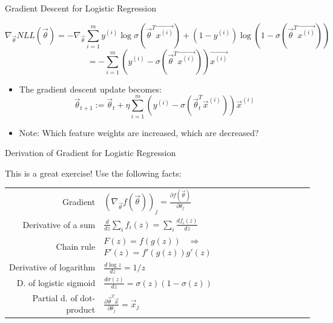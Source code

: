 
\begin{vbframe}{Gradient Descent for Logistic Regression}

\vfill

$$\nabla_{\vec\theta} NLL(\vec \theta) =  -\nabla_{\vec\theta} \sum_{i=1}^m y^{(i)} \log \sigma(\vec{\theta}^T \vec{x^{(i)}}) + (1-y^{(i)}) \log (1 - \sigma(\vec{\theta}^T \vec{x^{(i)}}))$$
$$= - \sum_{i=1}^m (y^{(i)} - \sigma(\vec{\theta}^T \vec{x^{(i)}})) \vec{x^{(i)}}  $$
\begin{itemize}
\item The gradient descent update becomes:
$$\vec{\theta}_{t+1} := \vec{\theta}_{t} + \eta \sum_{i=1}^m (y^{(i)} - \sigma(\vec{\theta}_{t}^T \vec{x}^{(i)})) \vec{x}^{(i)} $$

\item Note: Which feature weights are increased, which are decreased?
\end{itemize}
\begin{center}
\end{center}

\vfill

\end{vbframe}



\begin{vbframe}{Derivation of Gradient for Logistic Regression}

\vfill

This is a great exercise! Use the following facts:\\
\vspace{.2cm}
\renewcommand{\arraystretch}{2}
\begin{tabular}{r|l}
Gradient & $(\nabla_{\vec\theta} f(\vec \theta))_j = \frac{\partial f(\vec \theta)}{\partial \theta_j}$\\
Derivative of a sum & $\frac{d}{dz}\sum_i f_i(z) = \sum_i \frac{df_i(z)}{dz} $\\

Chain rule & $F(z) = f(g(z))$ \ $\Rightarrow$ \ $F'(z) = f'(g(z)) g'(z)$\\
Derivative of logarithm & $\frac{d \log z}{dz} = 1/z$\\
D. of logistic sigmoid & $\frac{d \sigma(z)}{dz} = \sigma(z)(1-\sigma(z))$\\
Partial d. of dot-product & $\frac{\partial \vec{\theta}^T \vec x}{\partial \theta_j} = \vec{x}_j$\\
\end{tabular}
%

\vfill

\end{vbframe}


